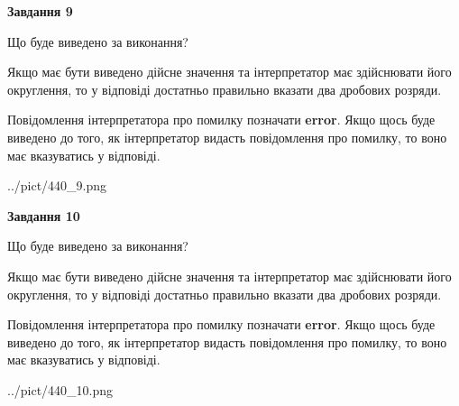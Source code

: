 \documentclass[12pt, ukrainian]{article}
\begin{document}
{\begin {Large}
{\begin {center}\textbf{Завдання 9}\end {center}}\par
Що буде виведено за виконання? \par

Якщо має бути виведено дійсне значення та інтерпретатор має здійснювати його округлення, 
то у відповіді достатньо правильно вказати два дробових розряди.

Повідомлення інтерпретатора про помилку позначати \textbf{error}.
Якщо щось буде виведено до того, як інтерпретатор видасть повідомлення про помилку, 
то воно має вказуватись у відповіді. \par

\begin{center}
	{../pict/440_9.png}
\end{center}
\newpage

{\begin {center}\textbf{Завдання 10}\end {center}}\par
Що буде виведено за виконання? \par

Якщо має бути виведено дійсне значення та інтерпретатор має здійснювати його округлення, 
то у відповіді достатньо правильно вказати два дробових розряди.

Повідомлення інтерпретатора про помилку позначати \textbf{error}.
Якщо щось буде виведено до того, як інтерпретатор видасть повідомлення про помилку, 
то воно має вказуватись у відповіді. \par

\begin{center}
	{../pict/440_10.png}
\end{center}
\newpage

\end {Large}}
\end{document}
